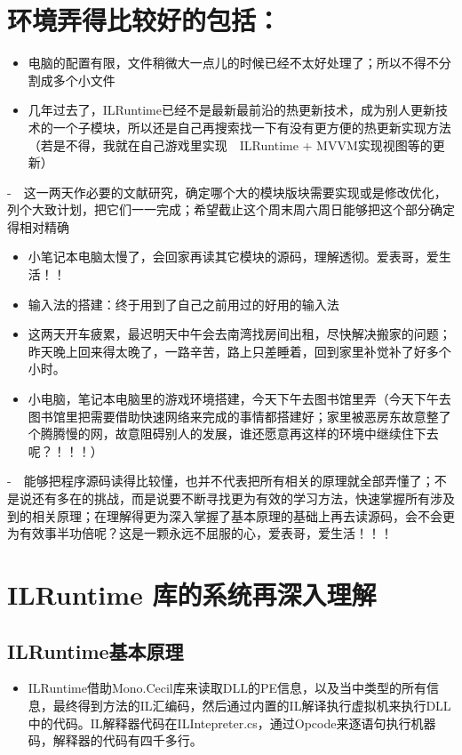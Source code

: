 \documentclass[9pt, b5paper]{article}
\begin{document}
\section{环境弄得比较好的包括：}
\label{sec-7}
\begin{itemize}
\item 电脑的配置有限，文件稍微大一点儿的时候已经不太好处理了；所以不得不分割成多个小文件
\item 几年过去了，ILRuntime已经不是最新最前沿的热更新技术，成为别人更新技术的一个子模块，所以还是自己再搜索找一下有没有更方便的热更新实现方法（若是不得，我就在自己游戏里实现　ILRuntime + MVVM实现视图等的更新）
\end{itemize}
-　这一两天作必要的文献研究，确定哪个大的模块版块需要实现或是修改优化，列个大致计划，把它们一一完成；希望截止这个周末周六周日能够把这个部分确定得相对精确
\begin{itemize}
\item 小笔记本电脑太慢了，会回家再读其它模块的源码，理解透彻。爱表哥，爱生活！！
\item 输入法的搭建：终于用到了自己之前用过的好用的输入法
\item 这两天开车疲累，最迟明天中午会去南湾找房间出租，尽快解决搬家的问题；昨天晚上回来得太晚了，一路辛苦，路上只差睡着，回到家里补觉补了好多个小时。
\item 小电脑，笔记本电脑里的游戏环境搭建，今天下午去图书馆里弄（今天下午去图书馆里把需要借助快速网络来完成的事情都搭建好；家里被恶房东故意整了个腾腾慢的网，故意阻碍别人的发展，谁还愿意再这样的环境中继续住下去呢？！！！）
\end{itemize}
-　能够把程序源码读得比较懂，也并不代表把所有相关的原理就全部弄懂了；不是说还有多在的挑战，而是说要不断寻找更为有效的学习方法，快速掌握所有涉及到的相关原理；在理解得更为深入掌握了基本原理的基础上再去读源码，会不会更为有效事半功倍呢？这是一颗永远不屈服的心，爱表哥，爱生活！！！
\section{ILRuntime 库的系统再深入理解}
\label{sec-8}
\subsection{ILRuntime基本原理}
\label{sec-8-1}
\begin{itemize}
\item ILRuntime借助Mono.Cecil库来读取DLL的PE信息，以及当中类型的所有信息，最终得到方法的IL汇编码，然后通过内置的IL解译执行虚拟机来执行DLL中的代码。IL解释器代码在ILIntepreter.cs，通过Opcode来逐语句执行机器码，解释器的代码有四千多行。
\end{itemize}
\end{document}
